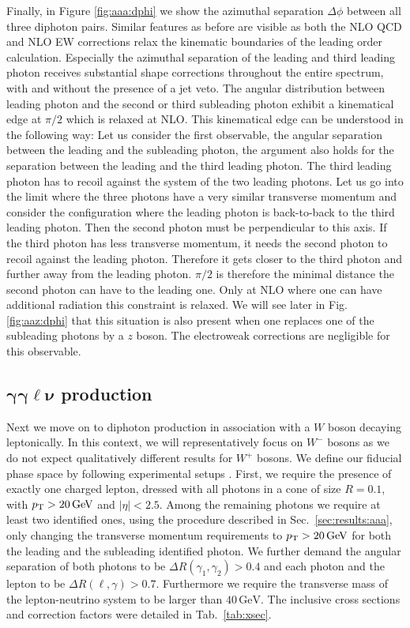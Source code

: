 Finally, in Figure \ref{fig:aaa:dphi} we show the azimuthal 
separation $\Delta\phi$ between all three diphoton pairs. 
Similar features as before are visible as both the NLO QCD 
and NLO EW corrections relax the kinematic boundaries of 
the leading order calculation. 
Especially the azimuthal separation of the leading and 
third leading photon receives substantial shape corrections 
throughout the entire spectrum, with and without the 
presence of a jet veto. The angular distribution between leading photon
and the second or third subleading photon exhibit a kinematical edge at $\pi/2$ which 
is relaxed at NLO. 
This kinematical edge can be understood in the following way:
 Let us consider the first observable, the angular separation between 
the leading and the subleading photon, the argument also holds for the separation between
the leading and the third leading photon. The third leading photon has to recoil against the
system of the two leading photons. Let us go into the limit where the three photons have
a very similar transverse momentum and consider the configuration where the leading
photon is back-to-back to the third leading photon. Then the second photon must 
be perpendicular to this axis. If the third photon has less transverse momentum, it 
needs the second photon to recoil against the leading photon. Therefore it gets closer
to the third photon and further away from the leading photon. $\pi/2$ is therefore the
minimal distance the second photon can have to the leading one.  Only at NLO where
one can have additional radiation this constraint is relaxed. We will see later in Fig.
\ref{fig:aaz:dphi} that this situation is also present when one replaces one of the subleading
photons by a $z$ boson. 
The electroweak corrections are negligible for this 
observable.


\subsection[\texorpdfstring{$\gamma\gamma\ell\nu$}{aalnu} production]
           {$\boldsymbol{\gamma\gamma\ell\nu}$ production}
\label{sec:results:aaw}

Next we move on to diphoton production in association with 
a $W$ boson decaying leptonically.
In this context, we will representatively focus on $W^-$ bosons 
as we do not expect qualitatively different results for $W^+$ 
bosons. 
We define our fiducial phase space by following experimental setups \cite{Aad:2015uqa}. 
First, we require the presence of exactly one charged lepton, 
dressed with all photons in a cone of size $R=0.1$, with 
$p_\text{T}>20\,\text{GeV}$ and $|\eta|<2.5$. 
Among the remaining photons we require at least two identified 
ones, using the procedure described in Sec.\ \ref{sec:results:aaa}, 
only changing the transverse momentum requirements to 
$p_\text{T}>20\,\text{GeV}$ for both the leading and the subleading 
identified photon. 
We further demand the angular separation of both photons 
to be $\Delta R(\gamma_1,\gamma_2)>0.4$ and each photon and 
the lepton to be $\Delta R(\ell,\gamma)>0.7$.
Furthermore we require the transverse mass of the lepton-neutrino system
to be larger than $40\, \text{GeV}$.
The inclusive cross sections and correction factors were 
detailed in Tab.\ \ref{tab:xsec}.


